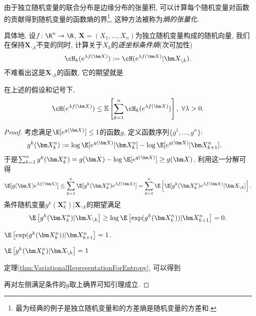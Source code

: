 由于独立随机变量的联合分布是边缘分布的张量积, 可以计算每个随机变量对函数的贡献得到随机变量的函数熵的界\footnote{最为经典的例子是独立随机变量和的方差熵是随机变量的方差和.}, 这种方法被称为\emph{熵的张量化}.


具体地, 设$f \colon \R^n \to \R$, $\bm X = (X_1, \dots, X_n)$为独立随机变量构成的随机向量, 我们在保持$\bm X_{\backslash k}$不变的同时, 计算关于$X_k$的\emph{逐坐标条件熵}(次可加性)
\begin{equation*}
	\cH_k ( e^{\lambda f(\bm X)} )
	:= \cH ( e^{\lambda f(\bm X)} | \bm X_{\backslash k} ). 
\end{equation*}
不难看出这是$\bm X_{\backslash k}$的函数, 它的期望就是

\begin{lemma}[熵的张量化]\label{lemma:EntropyTensorization}
	在上述的假设和记号下, 
	\begin{equation*}
		\cH(e^{\lambda f(\bm X)})
		\leq \mathbb{E}\left[ \sum_{k=1}^n \cH_k (e^{\lambda f(\bm X)}) \right],\; 
		\forall \lambda > 0. 
	\end{equation*}
\end{lemma}
\begin{proof}
	考虑满足$\E[e^{g(\bm X)}] \leq 1$的函数$g$, 定义函数序列$\{g^1, \dots, g^n\}$: 
	\begin{align*}
		g^k(\bm X_k^n) &:= \log \E[e^{g(\bm X)} | \bm X_k^n] - \log \E[e^{g(\bm X)} | \bm X_{k+1}^n]. 
	\end{align*}
	于是$\sum_{k=1}^n g^k(\bm X_k^n) = g(\bm X) - \log \E[ e^{g(\bm X)} ] \geq g(\bm X)$, 利用这一分解可得
	\begin{equation*}
		\E [ g(\bm X) e^{\lambda f(\bm X)}]
		\leq \sum_{k=1}^n \E[ g^k(\bm X_k^n) e^{\lambda f(\bm X)} ] 
		= \sum_{k=1}^n \E \left[ \E[ g^k(\bm X_k^n) e^{\lambda f(\bm X)} | \bm X_{\backslash k} ] \right]. 
	\end{equation*}
	条件随机变量$g^k(\bm X_k^n)| \bm X_{\backslash k}$的期望满足
	\begin{equation*}
		\E \left[ g^k(\bm X_k^n) | \bm X_{\backslash k} \right]
		\geq \log \E \left[ \exp(g^k(\bm X_k^n)) |\bm X_{k+1}^n \right] = 0. 
	\end{equation*}
	
	$\E \left[ \exp(g^k(\bm X_k^n)) |\bm X_{k+1}^n \right] = 1$. 
	
	$\E \left[ g^k(\bm X_k^n) | \bm X_{\backslash k} \right] = 1$
	
	
	
	定理\ref{thm:VariationalRepresentationForEntropy}, 可以得到
	
	再对左侧满足条件的$g$取上确界可知引理成立. 
\end{proof}

